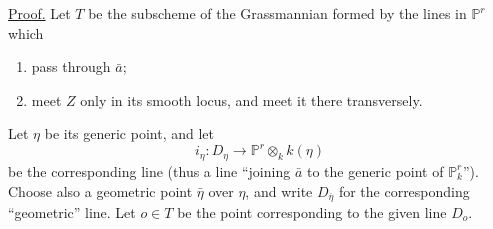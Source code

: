 \underline{Proof.}
Let $T$ be the subscheme of the Grassmannian formed by the lines in
$\mathbb P^r$ which
\begin{enumerate}[label=(\roman*)]
\item pass through $\bar a$;
\item meet $Z$ only in its smooth locus, and meet it there transversely.
\end{enumerate}
Let $\eta$ be its generic point, and let
\[
i_\eta:D_\eta\longrightarrow\mathbb P^r\otimes_k k(\eta)
\]
be the corresponding line (thus a line ``joining $\bar a$ to the generic
point of $\mathbb P^r_k$'').  Choose also a geometric point $\bar\eta$ over
$\eta$, and write $D_{\bar\eta}$ for the corresponding ``geometric'' line.
Let $o\in T$ be the point corresponding to the given line $D_o$.
